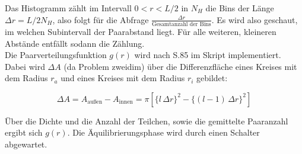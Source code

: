 Das Histogramm zählt im Intervall $0<r<L/2$ in $N_H$ die Bins der Länge $\Delta r = L / 2 N_H$, also folgt für die Abfrage $\frac{\Delta r}{\text{Gesamtanzahl der Bins}}$. Es wird also geschaut, im welchen Subintervall der Paarabstand liegt. Für alle weiteren, kleineren Abstände entfällt sodann die Zählung.\\

Die Paarverteilungsfunktion $g(r)$ wird nach S.85 im Skript implementiert. Dabei wird $\Delta A$ (da Problem zweidim) über die Differenzfläche eines Kreises mit dem Radius $r_a$ und eines Kreises mit dem Radius $r_i$ gebildet:

\begin{equation*}
\Delta A = A_{\text{außen}} - A_{\text{innen}} = \pi [\{l \, \Delta r\}^2-\{(l-1)\,\Delta r\}^2]
\end{equation*}

Über die Dichte und die Anzahl der Teilchen, sowie die gemittelte Paaranzahl ergibt sich $g(r)$. Die Äquilibrierungsphase wird durch einen Schalter abgewartet.



